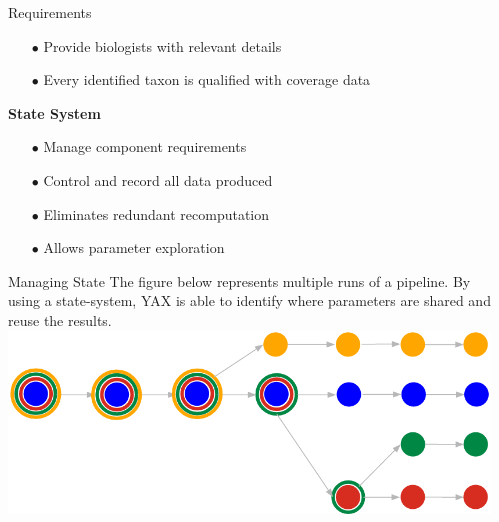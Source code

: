\documentclass[final,t]{beamer}
\begin{document}
\begin{frame}{}
\begin{columns}[t]
\begin{column}{.3\linewidth}
\begin{block}{Requirements}
            \begin{itemize}
                \item[$\bullet$]Provide biologists with relevant details
                \item[$\bullet$]Every identified taxon is qualified with coverage data
            \end{itemize}
            \vspace{0.5cm}
            \textbf{State System}
            \begin{itemize}
                \item[$\bullet$]Manage component requirements
                \item[$\bullet$]Control and record all data produced
                \item[$\bullet$]Eliminates redundant recomputation
                \item[$\bullet$]Allows parameter exploration
            \end{itemize}
        \end{block}

        \begin{block}{Managing State}
            The figure below represents multiple runs of a pipeline. By using a state-system, YAX is able to identify where parameters are shared and reuse the results. \\
            \includegraphics[width=1\linewidth]{assets/Artifacts}
        \end{block}



    \end{column}
    \begin{column}{.3\linewidth}



\end{column}
\end{columns}
\end{frame}
\end{document}
